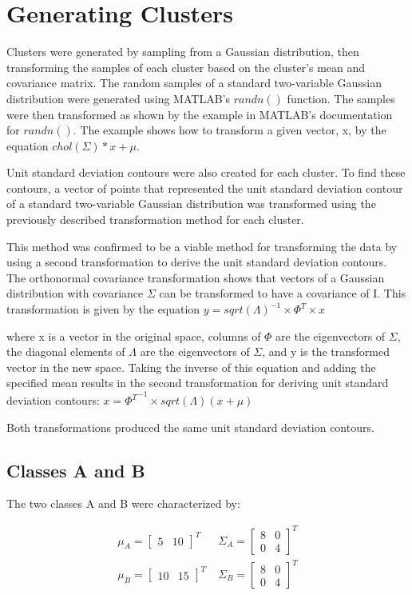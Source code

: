 \section{Generating Clusters}
Clusters were generated by sampling from a Gaussian distribution, then transforming the samples of each cluster based on the cluster's mean and covariance matrix. The random samples of a standard two-variable Gaussian distribution were generated using MATLAB's $randn()$ function. The samples were then transformed as shown by the example in MATLAB's documentation for $randn()$. The example shows how to transform a given vector, x, by the equation
$chol(\Sigma)*x+\mu$.

Unit standard deviation contours were also created for each cluster. To find these contours, a vector of points that represented the unit standard deviation contour of a standard two-variable Gaussian distribution was transformed using the previously described transformation method for each cluster.

This method was confirmed to be a viable method for transforming the data by using a second transformation to derive the unit standard deviation contours. The orthonormal covariance transformation shows that vectors of a Gaussian distribution with covariance $\Sigma$ can be transformed to have a covariance of I. This transformation is given by the equation
$y = {sqrt(\Lambda)}^{-1} \times \Phi^T \times x$

where x is a vector in the original space, columns of $\Phi$ are the eigenvectors of $\Sigma$, the diagonal elements of $\Lambda$ are the eigenvectors of $\Sigma$, and y is the transformed vector in the new space. Taking the inverse of this equation and adding the specified mean results in the second transformation for deriving unit standard deviation contours:
$x = {\Phi^{T}}^{-1} \times sqrt(\Lambda)(x+\mu)$

Both transformations produced the same unit standard deviation contours.
 
 \subsection{Classes A and B}
 The two classes A and B were characterized by:

\begin{eqnarray}
{\mu}_{A}=\left[ \begin{smallmatrix} 5&10 \end{smallmatrix}\right]^{T} \; & {\Sigma}_{A}=\left[ \begin{smallmatrix} 8&0 \\ 0&4 \end{smallmatrix}\right]^{T} \nonumber\\
{\mu}_{B}=\left[ \begin{smallmatrix} 10&15 \end{smallmatrix}\right]^{T} \; & {\Sigma}_{B}=\left[ \begin{smallmatrix} 8&0 \\ 0&4 \end{smallmatrix}\right]^{T} \nonumber
\end{eqnarray}

